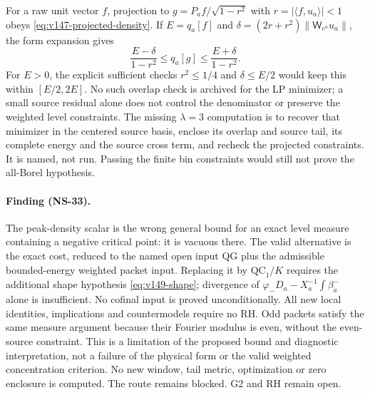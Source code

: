 For a raw unit vector $f$, projection to
$g=P_af/\sqrt{1-r^2}$ with $r=|\langle f,u_a\rangle|<1$ obeys
\eqref{eq:v147-projected-density}. If $E=q_a[f]$ and
$\delta=(2r+r^2)\|\mathsf W_{e^a}u_a\|$, the form expansion gives
\[
 \frac{E-\delta}{1-r^2}\le q_a[g]\le\frac{E+\delta}{1-r^2}.
\]
For $E>0$, the explicit sufficient checks $r^2\le1/4$ and
$\delta\le E/2$ would keep this within $[E/2,2E]$. No such overlap
check is archived for the LP minimizer; a small source residual alone
does not control the denominator or preserve the weighted level
constraints. The missing $\lambda=3$ computation is to recover that
minimizer in the centered source basis, enclose its overlap and source
tail, its complete energy and the source cross term, and recheck the
projected constraints. It is named, not run. Passing the finite bin
constraints would still not prove the all-Borel hypothesis.

\paragraph{Finding (NS-33).}
The peak-density scalar is the wrong general bound for an exact level
measure containing a negative critical point: it is vacuous there.
The valid alternative is the exact cost, reduced to the named open
input QG plus the admissible bounded-energy weighted packet input.
Replacing it by $\mathrm{QC}_1/K$ requires the additional shape
hypothesis \eqref{eq:v149-shape}; divergence of
$\varphi_-D_a-X_a^{-1}\int\beta_a^-$ alone is insufficient. No cofinal
input is proved unconditionally. All new local identities, implications
and countermodels require no RH. Odd packets satisfy the same measure
argument because their Fourier modulus is even, without the even-source
constraint. This is a limitation of the proposed bound and diagnostic
interpretation, not a failure of the physical form or the valid weighted
concentration criterion. No new window, tail metric, optimization or zero
enclosure is computed. The route remains blocked. G2 and RH remain open.

